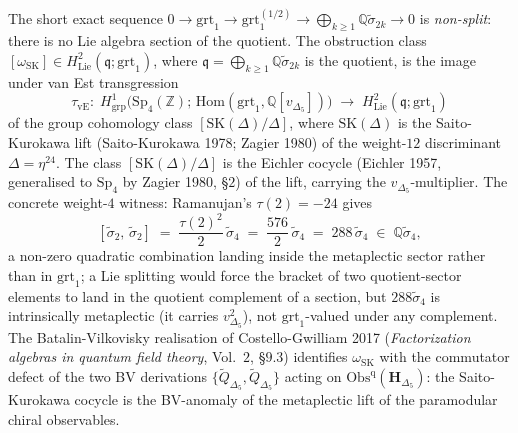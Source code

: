 \begin{remark}
\label{rem:saito-kurokawa-van-est}
The short exact sequence
$0 \to \mathrm{grt}_1 \to \mathrm{grt}_1^{(1/2)} \to
\bigoplus_{k\geq 1}\mathbb{Q}\widetilde\sigma_{2k} \to 0$
is \emph{non-split}: there is no Lie algebra section of the quotient. The
obstruction class $[\omega_{\mathrm{SK}}]\in
H^2_{\mathrm{Lie}}(\mathfrak{q};\mathrm{grt}_1)$, where
$\mathfrak{q}=\bigoplus_{k\geq 1}\mathbb{Q}\widetilde\sigma_{2k}$ is the quotient,
is the image under van Est transgression
\[
 \tau_{\mathrm{vE}}:\;
 H^1_{\mathrm{grp}}\bigl(\mathrm{Sp}_4(\mathbb{Z});\,
 \mathrm{Hom}(\mathrm{grt}_1,\mathbb{Q}[v_{\Delta_5}])\bigr)
 \;\longrightarrow\;
 H^2_{\mathrm{Lie}}(\mathfrak{q};\mathrm{grt}_1)
\]
of the group cohomology class $[\mathrm{SK}(\Delta)/\Delta]$, where
$\mathrm{SK}(\Delta)$ is the Saito-Kurokawa lift (Saito-Kurokawa 1978; Zagier
1980) of the weight-$12$ discriminant $\Delta=\eta^{24}$. The class
$[\mathrm{SK}(\Delta)/\Delta]$ is the Eichler cocycle (Eichler 1957, generalised
to $\mathrm{Sp}_4$ by Zagier 1980, \S $2$) of the lift, carrying the
$v_{\Delta_5}$-multiplier. The concrete weight-$4$ witness: Ramanujan's
$\tau(2)=-24$ gives
\[
 [\widetilde\sigma_2,\,\widetilde\sigma_2]
 \;=\;\frac{\tau(2)^2}{2}\,\widetilde\sigma_4
 \;=\;\frac{576}{2}\,\widetilde\sigma_4
 \;=\;288\,\widetilde\sigma_4
 \;\in\;\mathbb{Q}\widetilde\sigma_4,
\]
a non-zero quadratic combination landing inside the metaplectic sector rather than
in $\mathrm{grt}_1$; a Lie splitting would force the bracket of two
quotient-sector elements to land in the quotient complement of a section, but
$288\widetilde\sigma_4$ is intrinsically metaplectic (it carries
$v_{\Delta_5}^2$), not $\mathrm{grt}_1$-valued under any complement. The
Batalin-Vilkovisky realisation of Costello-Gwilliam 2017 (\emph{Factorization
algebras in quantum field theory}, Vol.\ $2$, \S $9.3$) identifies
$\omega_{\mathrm{SK}}$ with the commutator defect of the two BV derivations
$\{\widetilde Q_{\Delta_5},\widetilde Q_{\Delta_5}\}$ acting on
$\mathrm{Obs}^{\mathrm{q}}(\mathbf{H}_{\Delta_5})$: the Saito-Kurokawa cocycle is
the BV-anomaly of the metaplectic lift of the paramodular chiral observables.
\end{remark}

